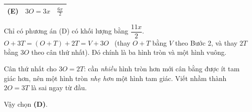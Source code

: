 {\begin{center}
\begin{tabular}{|c|l|c|}
(E) & $3O = 3x$ & $\tfrac{6x}{2}$ \\ \hline
\end{tabular}
\end{center}
Chỉ có phương án (D) có khối lượng bằng $\dfrac{11x}{2}$.
$O + 3T = (O + T) + 2T = V + 3O$ \ (thay $O + T$ bằng $V$ theo Bước 2, và thay $2T$ bằng $3O$ theo cân thứ nhất). Đó chính là
ba hình tròn và một hình vuông.
\begin{warnbox}Cân thứ nhất cho $3O = 2T$: cần \emph{nhiều} hình tròn hơn mới cân bằng được ít tam giác hơn, nên một hình tròn
\emph{nhẹ hơn} một hình tam giác. Viết nhầm thành $2O = 3T$ là sai ngay từ đầu.\end{warnbox}
Vậy chọn \textbf{(D)}.
}

